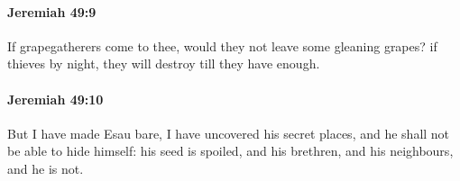 		\paragraph{Jeremiah 49:9} %
			\label{JEREMIAH-49-9}

			If grapegatherers come to thee, would they not leave some gleaning grapes? if thieves by night, they will destroy till they have enough.


		\paragraph{Jeremiah 49:10} %
			\label{JEREMIAH-49-10}

			But I have made Esau bare, I have uncovered his secret places, and he shall not be able to hide himself: his seed is spoiled, and his brethren, and his neighbours, and he is not.


